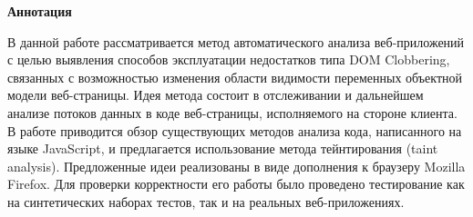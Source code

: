 
\setlength{\parskip}{0pt}
\begin{center}
	{\LARGE{\textbf{Аннотация}} \par}
\end{center}
\bigskip
     В данной работе рассматривается метод автоматического анализа веб-приложений с целью выявления способов эксплуатации недостатков типа DOM Clobbering, связанных с возможностью изменения области видимости переменных объектной модели веб-страницы. Идея метода состоит в отслеживании и дальнейшем анализе потоков данных в коде веб-страницы, исполняемого на стороне клиента.
     В работе приводится обзор существующих методов анализа кода, написанного на языке JavaScript, и предлагается использование метода тейнтирования (taint analysis).
     Предложенные идеи реализованы в виде дополнения к браузеру Mozilla Firefox. Для проверки корректности его работы было проведено тестирование как на синтетических наборах тестов, так и на реальных веб-приложениях.
\bigskip



